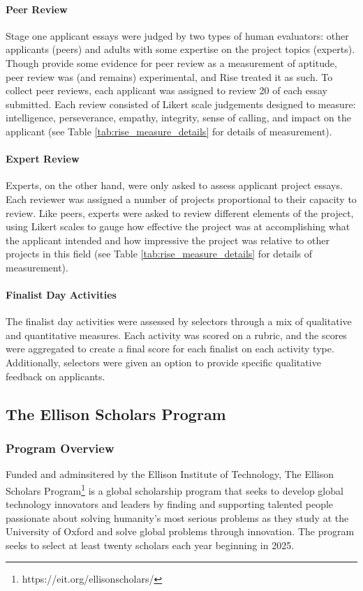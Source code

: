 \paragraph{Peer Review}
Stage one applicant essays were judged by two types of human evaluators: other applicants (peers) and adults with some expertise on the project topics (experts). Though \textcite{citation needed} provide some evidence for peer review as a measurement of aptitude, peer review was (and remains) experimental, and Rise treated it as such. To collect peer reviews, each applicant was assigned to review 20 of each essay submitted. Each review consisted of Likert scale judgements designed to measure: intelligence, perseverance, empathy, integrity, sense of calling, and impact on the applicant (see Table \ref{tab:rise_measure_details} for details of measurement).

\paragraph{Expert Review} 
Experts, on the other hand, were only asked to assess applicant project essays. Each reviewer was assigned a number of projects proportional to their capacity to review. Like peers, experts were asked to review different elements of the project, using Likert scales to gauge how effective the project was at accomplishing what the applicant intended and how impressive the project was relative to other projects in this field (see Table \ref{tab:rise_measure_details} for details of measurement). 

\paragraph{Finalist Day Activities}
The finalist day activities were assessed by selectors through a mix of qualitative and quantitative measures. Each activity was scored on a rubric, and the scores were aggregated to create a final score for each finalist on each activity type. Additionally, selectors were given an option to provide specific qualitative feedback on applicants.

\subsection{The Ellison Scholars Program}\label{ssec:ellison}
\subsubsection{Program Overview}
Funded and adminsitered by the Ellison Institute of Technology, The Ellison Scholars Program\footnote{https://eit.org/ellisonscholars/} is a global scholarship program that seeks to develop global technology innovators and leaders by finding and supporting talented people passionate about solving humanity’s most serious problems as they study at the University of Oxford and solve global problems through innovation. The program seeks to select at least twenty scholars each year beginning in 2025.

